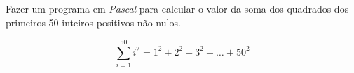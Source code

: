 \item Fazer um programa em \emph{Pascal} para
     calcular o  valor da  soma dos  quadrados dos  primeiros  50 inteiros
     positivos não nulos.

\[
\sum_{i=1}^{50}{i^2} = 1^2 + 2^2 + 3^2 + \ldots + 50^2
\]